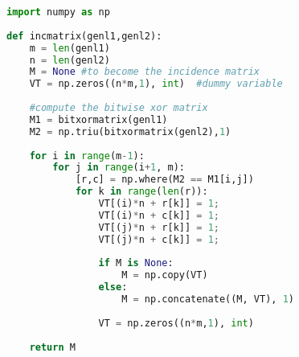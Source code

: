 \begin{lstlisting}[language=Python, caption=Python example]
import numpy as np
 
def incmatrix(genl1,genl2):
    m = len(genl1)
    n = len(genl2)
    M = None #to become the incidence matrix
    VT = np.zeros((n*m,1), int)  #dummy variable
 
    #compute the bitwise xor matrix
    M1 = bitxormatrix(genl1)
    M2 = np.triu(bitxormatrix(genl2),1) 
 
    for i in range(m-1):
        for j in range(i+1, m):
            [r,c] = np.where(M2 == M1[i,j])
            for k in range(len(r)):
                VT[(i)*n + r[k]] = 1;
                VT[(i)*n + c[k]] = 1;
                VT[(j)*n + r[k]] = 1;
                VT[(j)*n + c[k]] = 1;
 
                if M is None:
                    M = np.copy(VT)
                else:
                    M = np.concatenate((M, VT), 1)
 
                VT = np.zeros((n*m,1), int)
 
    return M
\end{lstlisting}



